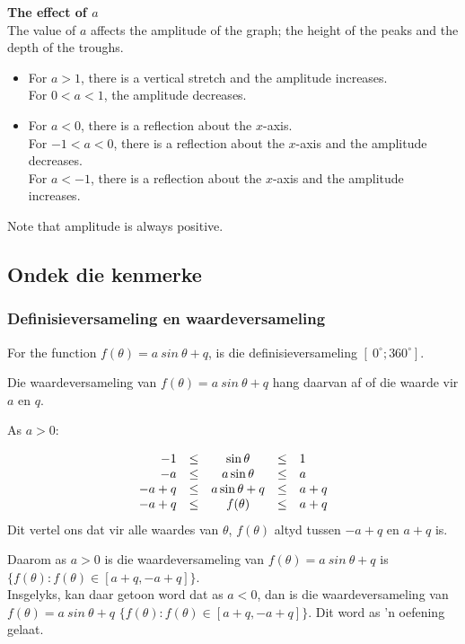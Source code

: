 \textbf{The effect of $a$}
\\
The value of $a$ affects the amplitude of the graph; the height of the
peaks and the depth of the troughs.
\begin{itemize}
 \item For $a>1$, there is a vertical stretch and the amplitude increases.\\
For $0<a<1$, the amplitude decreases.
\item For $a<0$, there is a reflection about the $x$-axis.\\ 
For $-1<a<0$, there is a reflection about the $x$-axis and the amplitude decreases.\\
For $a<-1$, there is a reflection about the $x$-axis and the amplitude increases.
\end{itemize}

Note that amplitude is always positive.\\

\subsection*{Ondek die kenmerke}
\subsubsection*{Definisieversameling en waardeversameling}
\nopagebreak
For the function $f(\theta )=a~sin~\theta +q$, is die definisieversameling $[~0^{\circ}; 360^{\circ}]$.\par 
Die waardeversameling van $f(\theta )=a~sin~\theta +q$ hang daarvan af of die waarde vir $a$ en $q$.\par 
As $a>0$:\par 
\nopagebreak\noindent{}
\begin{equation*}
  \begin{array}{rcccl}
    \hfill   -1 & \leq &  \sin\theta     & \leq & 1   \hfill \\
    \hfill   -a & \leq & a\sin\theta     & \leq & a   \hfill \\
    \hfill -a+q & \leq & a\sin\theta + q & \leq & a+q \hfill \\
    \hfill -a+q & \leq &  f(\theta)      & \leq & a+q \hfill 
  \end{array}
\end{equation*}
Dit vertel ons dat vir alle waardes van $\theta $, $f(\theta )$ altyd tussen $-a+q$ en $a+q$ is.\par
Daarom as $a>0$ is die waardeversameling van  $f(\theta )=a~sin~\theta +q$ is $\{f(\theta ):f(\theta )\in [a+q,-a+q]\}$.\\
Insgelyks, kan daar getoon word dat as $a<0$, dan is die waardeversameling van $f(\theta )=a~sin~\theta +q$ $\{f(\theta ):f(\theta )\in [a+q,-a+q]\}$. Dit word as ’n oefening gelaat.\par 

